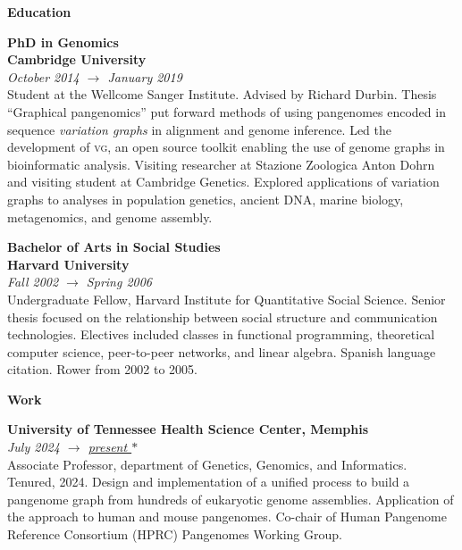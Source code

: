 \documentclass[11pt,hidelinks,letterpaper]{article}
\begin{document}

\hfill \break
\hfill \break
\noindent
{\LARGE \bf Education}

\hfill \break
\noindent
{\large \bf PhD in Genomics \\
  Cambridge University
} \\
\emph{October 2014 $\to$ January 2019} \\
\noindent
Student at the Wellcome Sanger Institute.
Advised by Richard Durbin.
Thesis ``Graphical pangenomics'' put forward methods of using pangenomes encoded in sequence \emph{variation graphs} in alignment and genome inference.
Led the development of \textsc{vg}, an open source toolkit enabling the use of genome graphs in bioinformatic analysis.
Visiting researcher at Stazione Zoologica Anton Dohrn and visiting student at Cambridge Genetics.
Explored applications of variation graphs to analyses in population genetics, ancient DNA, marine biology, metagenomics, and genome assembly.

\hfill \break
\noindent
{\large \bf Bachelor of Arts in Social Studies \\ Harvard University} \\
\emph{Fall 2002 $\to$ Spring 2006} \\
\noindent
Undergraduate Fellow, Harvard Institute for Quantitative Social Science. Senior thesis focused on the relationship between social structure and communication technologies. Electives included classes in functional programming, theoretical computer science, peer-to-peer networks, and linear algebra. Spanish language citation. Rower from 2002 to 2005.


\hfill \break
\hfill \break
\noindent
{\LARGE \bf Work}

\hfill \break
\noindent
{\large \bf University of Tennessee Health Science Center, Memphis} \\
\emph{July 2024 $\to$ \underline{present {\LARGE $\ast$}}} \\
\noindent
Associate Professor, department of Genetics, Genomics, and Informatics. Tenured, 2024.
Design and implementation of a unified process to build a pangenome graph from hundreds of eukaryotic genome assemblies.
Application of the approach to human and mouse pangenomes.
Co-chair of Human Pangenome Reference Consortium (HPRC) Pangenomes Working Group.
\end{document}
